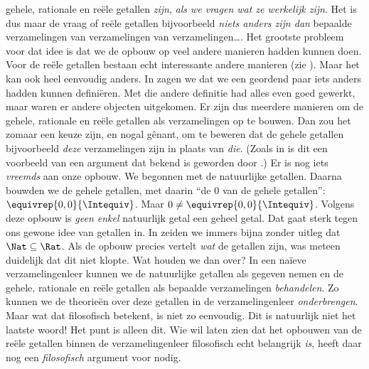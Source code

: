 \documentclass[../../../include/open-logic-section]{subfiles}
\begin{document}
gehele, rationale en reële getallen \emph{zijn}, \emph{als we vragen
wat ze werkelijk zijn}. Het is dus maar de vraag of reële getallen
bijvoorbeeld \emph{niets anders zijn dan} bepaalde verzamelingen van
verzamelingen van verzamelingen\ldots. Het grootste probleem voor dat idee
is dat we de opbouw op veel andere manieren hadden kunnen doen. Voor de reële getallen bestaan echt
interessante andere manieren (zie ). Maar het kan
ook heel eenvoudig anders. In  zagen we dat
we een geordend paar iets anders hadden kunnen definiëren. Met die
andere definitie had alles even goed gewerkt, maar waren er andere
objecten uitgekomen. Er zijn dus meerdere manieren om de gehele,
rationale en reële getallen als verzamelingen op te bouwen. Dan zou het
zomaar een keuze zijn, en nogal gênant, om te beweren dat de gehele
getallen bijvoorbeeld \emph{deze} verzamelingen zijn in plaats van
\emph{die}. (Zoals in  is dit een voorbeeld
van een argument dat bekend is geworden door
\citealt{Benacerraf1965}.)
Er is nog iets \emph{vreemds} aan onze opbouw. We begonnen met de
natuurlijke getallen. Daarna bouwden we de gehele getallen, met daarin
``de $0$ van de gehele getallen'': $ \equivrep{0,0}{\Intequiv}$. Maar
$0 \neq \equivrep{0,0}{\Intequiv}$. Volgens deze opbouw is
\emph{geen enkel} natuurlijk getal een geheel getal. Dat gaat sterk
tegen ons gewone idee van getallen in. In
 zeiden we immers bijna zonder uitleg dat
$\Nat \subseteq \Rat$. Als de opbouw precies vertelt \emph{wat} de
getallen zijn, was meteen duidelijk dat dit niet klopte.
Wat houden we dan over? In een na\"ieve verzamelingenleer kunnen we de
natuurlijke getallen als gegeven nemen en de gehele, rationale en reële
getallen als bepaalde verzamelingen \emph{behandelen}. Zo kunnen we de
theorieën over deze getallen in de verzamelingenleer \emph{onderbrengen}.
Maar wat dat filosofisch betekent, is niet zo eenvoudig.
Dit is natuurlijk niet het laatste woord!{} Het punt is alleen dit. Wie
wil laten zien dat het opbouwen van de reële getallen binnen de
verzamelingenleer filosofisch echt
belangrijk \emph{is}, heeft daar nog een \emph{filosofisch} argument
voor nodig.
\end{document}
